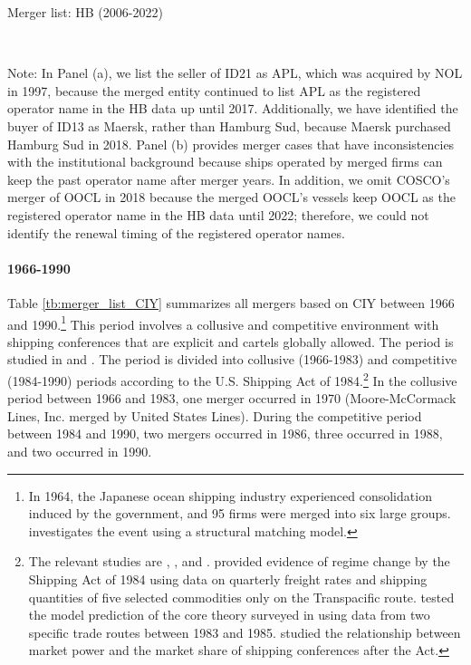 \documentclass[10pt]{article}
\begin{document}
\begin{table}[!htbp]
  \begin{center}
      \caption{Merger list: HB (2006-2022)}
      \label{tb:merger_list_HB} 
      \subfloat[HB (2006-2022)]{}\\
  \end{center}\footnotesize
  Note: In Panel (a), we list the seller of ID21 as APL, which was acquired by NOL in 1997, because the merged entity continued to list APL as the registered operator name in the HB data up until 2017. Additionally, we have identified the buyer of ID13 as Maersk, rather than Hamburg Sud, because Maersk purchased Hamburg Sud in 2018.
  Panel (b) provides merger cases that have inconsistencies with the institutional background because ships operated by merged firms can keep the past operator name after merger years.  In addition, we omit COSCO's merger of OOCL in 2018 because the merged OOCL's vessels keep OOCL as the registered operator name in the HB data until 2022; therefore, we could not identify the renewal timing of the registered operator names. 
\end{table} 

\paragraph{1966-1990} 

Table \ref{tb:merger_list_CIY} summarizes all mergers based on CIY between 1966 and 1990.\footnote{In 1964, the Japanese ocean shipping industry experienced consolidation induced by the government, and 95 firms were merged into six large groups. \cite{otani2021estimating} investigates the event using a structural matching model.}
This period involves a collusive and competitive environment with shipping conferences that are explicit and cartels globally allowed. 
The period is studied in \cite{matsuda2022unified} and \cite{otani2023industry}.
The period is divided into collusive (1966-1983) and competitive (1984-1990) periods according to the U.S. Shipping Act of 1984.\footnote{The relevant studies are \cite{wilson1991some}, \cite{pirrong1992application}, and \cite{clyde1998market}. \cite{wilson1991some} provided evidence of regime change by the Shipping Act of 1984 using data on quarterly freight rates and shipping quantities of five selected commodities only on the Transpacific route. \cite{pirrong1992application} tested the model prediction of the core theory surveyed in \cite{sjostrom2013competition} using data from two specific trade routes between 1983 and 1985. \cite{clyde1998market} studied the relationship between market power and the market share of shipping conferences after the Act. }
In the collusive period between 1966 and 1983, one merger occurred in 1970 (Moore-McCormack Lines, Inc. merged by United States Lines). %
During the competitive period between 1984 and 1990, two mergers occurred in 1986, three occurred in 1988, and two occurred in 1990. 
\end{document}
